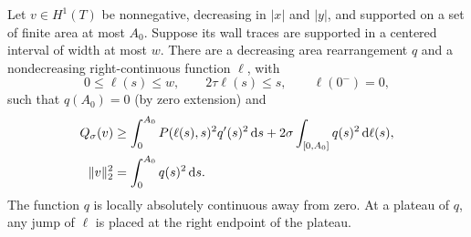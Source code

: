 \begin{lemma}\label{lem:window-energy}
Let $v\in H^1(T)$ be nonnegative, decreasing in $|x|$ and $|y|$, and supported on a set of finite area at most $A_0$. Suppose its wall traces are supported in a centered interval of width at most $w$. There are a decreasing area rearrangement $q$ and a nondecreasing right-continuous function $\ell$, with
\[
 0\le\ell(s)\le w,\qquad 2\tau\ell(s)\le s,\qquad \ell(0^-)=0,
\]
such that $q(A_0)=0$ (by zero extension) and
\begin{equation}\label{eq:window-energy}
 \begin{split}
 Q_\sigma(v)&\ge\int_0^{A_0}P(\ell(s),s)^2q'(s)^2\,\mathrm d s
                   +2\sigma\int_{[0,A_0]}q(s)^2\,\mathrm d\ell(s),\\
 \lVert v\rVert_2^2&=\int_0^{A_0}q(s)^2\,\mathrm d s.
 \end{split}
\end{equation}
The function $q$ is locally absolutely continuous away from zero. At a plateau of $q$, any jump of $\ell$ is placed at the right endpoint of the plateau.
\end{lemma}
